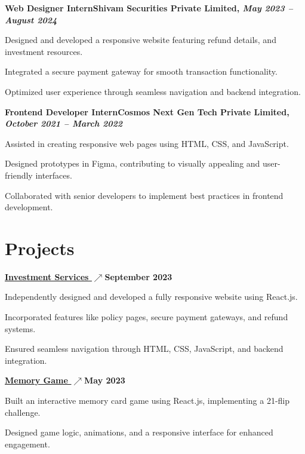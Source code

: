 \documentclass[letterpaper,10pt]{article}
\newcommand{\heading}[2]{
  \hspace{10pt}#1\hfill#2\\
}
\newcommand{\headingBf}[2]{
  \heading{\textbf{#1}}{\textbf{#2}}
}
\newenvironment{resume_list}{
  \vspace{-7pt}
  \begin{itemize}[itemsep=-2px, parsep=1pt, leftmargin=30pt]
}{
  \end{itemize}
}
\begin{document}
  \headingBf{Web Designer Intern}{Shivam Securities Private Limited, \textit{May 2023 -- August 2024}}
  \begin{resume_list}
    \item Designed and developed a responsive website featuring refund details, and investment resources.
    \item Integrated a secure payment gateway for smooth transaction functionality.
    \item Optimized user experience through seamless navigation and backend integration.
  \end{resume_list}

  \headingBf{Frontend Developer Intern}{Cosmos Next Gen Tech Private Limited, \textit{October 2021 -- March 2022}}
  \begin{resume_list}
    \item Assisted in creating responsive web pages using HTML, CSS, and JavaScript.
    \item Designed prototypes in Figma, contributing to visually appealing and user-friendly interfaces.
    \item Collaborated with senior developers to implement best practices in frontend development.
  \end{resume_list}


  \section{Projects}

    \headingBf {\underline{\href{https://shivamsecurities.com/}{Investment Services \(\nearrow\)}}}{September 2023}
    \begin{resume_list}
    \item Independently designed and developed a fully responsive website using React.js.
    \item Incorporated features like policy pages, secure payment gateways, and refund systems.
    \item Ensured seamless navigation through HTML, CSS, JavaScript, and backend integration.
    \end{resume_list} 
    
    \headingBf {\underline{\href{https://github.com/surajkr97/MemoryGame/tree/master/matchthecards}{Memory Game \(\nearrow\)}}}{May 2023}
    \begin{resume_list}
    \item Built an interactive memory card game using React.js, implementing a 21-flip challenge.
    \item Designed game logic, animations, and a responsive interface for enhanced engagement.
    \end{resume_list}
    
\end{document}
